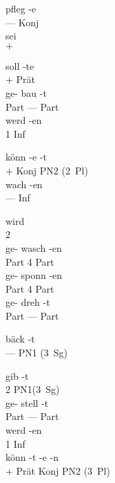 \begin{exe}
  \ex
  \begin{xlist}
    \ex\gll pfleg -e\\
    --- Konj\\
    \ex\gll sei\\
    $+$\\
  \end{xlist}
  \ex
  \begin{xlist}
    \ex\gll soll -te\\
    $+$ Prät\\
    \ex\gll ge- bau -t\\
    Part --- Part\\
    \ex\gll werd -en\\
    1 Inf\\
  \end{xlist}
  \ex
  \begin{xlist}
    \ex\gll könn -e -t\\
    $+$ Konj {PN2 (2~Pl)}\\
    \ex\gll wach -en\\
    --- Inf\\
  \end{xlist}
  \ex
  \begin{xlist}
    \ex\gll wird\\
    2\\
    \ex\gll ge- wasch -en\\
    Part 4 Part\\
    \ex\gll ge- sponn -en\\
    Part 4 Part\\
    \ex\gll ge- dreh -t\\
    Part --- Part\\
  \end{xlist}
  \ex\gll bäck -t\\
  --- {PN1 (3~Sg)}\\
  \ex
  \begin{xlist}
    \ex\gll gib -t\\
    2 PN1(3~Sg)\\
    \ex\gll ge- stell -t\\
    Part --- Part\\
    \ex\gll werd -en\\
    1 Inf\\
    \ex\gll könn -t -e -n\\
    $+$ Prät Konj {PN2 (3~Pl)}\\
  \end{xlist}
  \ex
  \begin{xlist}

\end{xlist}
\end{exe}
